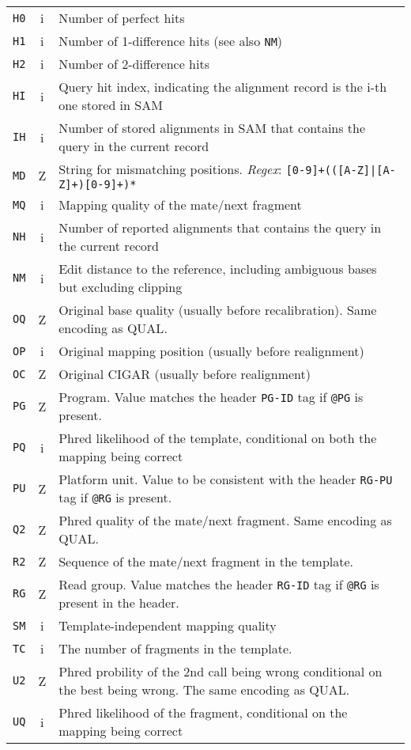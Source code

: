\documentclass[10pt]{article}
\begin{document}
\begin{center}
\begin{tabular}{ccp{12.5cm}}
  {\tt H0} & i & Number of perfect hits\\
  {\tt H1} & i & Number of 1-difference hits (see also {\tt NM})\\
  {\tt H2} & i & Number of 2-difference hits \\
  {\tt HI} & i & Query hit index, indicating the alignment record is the i-th one stored in SAM\\
  {\tt IH} & i & Number of stored alignments in SAM that contains the query in the current record\\
  {\tt MD} & Z & String for mismatching positions. \emph{Regex}: {\tt [0-9]+(([A-Z]|\char92\char94[A-Z]+)[0-9]+)*}\footnotemark[2]\\
  {\tt MQ} & i & Mapping quality of the mate/next fragment \\
  {\tt NH} & i & Number of reported alignments that contains the query in the current record\\
  {\tt NM} & i & Edit distance to the reference, including ambiguous bases but excluding clipping\\
  {\tt OQ} & Z & Original base quality (usually before recalibration). Same encoding as {\sf QUAL}.\\
  {\tt OP} & i & Original mapping position (usually before realignment) \\
  {\tt OC} & Z & Original CIGAR (usually before realignment) \\
  {\tt PG} & Z & Program. Value matches the header {\tt PG-ID} tag if {\tt @PG} is present. \\
  {\tt PQ} & i & Phred likelihood of the template, conditional on both the mapping being correct \\
  {\tt PU} & Z & Platform unit. Value to be consistent with the header {\tt RG-PU} tag if {\tt @RG} is present.\\
  {\tt Q2} & Z & Phred quality of the mate/next fragment. Same encoding as {\sf QUAL}.\\
  {\tt R2} & Z & Sequence of the mate/next fragment in the template. \\
  {\tt RG} & Z & Read group. Value matches the header {\tt RG-ID} tag if {\tt @RG} is present in the header. \\
  {\tt SM} & i & Template-independent mapping quality \\
  {\tt TC} & i & The number of fragments in the template.\\
  {\tt U2} & Z & Phred probility of the 2nd call being wrong conditional on the best being wrong. The same encoding as {\sf QUAL}. \\
  {\tt UQ} & i & Phred likelihood of the fragment, conditional on the mapping being correct \\
  \hline
\end{tabular}
\end{center}
\end{document}
